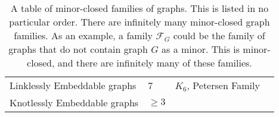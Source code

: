 \begin{table}[h!]
\begin{tabular}{@{}llll@{}}
    Linklessly Embeddable graphs & 7                                  & $K_6$, Petersen Family                           & \tablefootnote{\textcite{conwayKnotsLinksSpatial1983}} \\
    Knotlessly Embeddable graphs & $\geq 3$                           &                                                  & \tablefootnote{\textcite{conwayKnotsLinksSpatial1983,foisyIntrinsicallyKnottedGraphs2002,foisyIntrinsicallyKnottedGraphs2002}}          
    \end{tabular}
    \caption[Table of Minor-Closed Families of graphs]{A table of minor-closed families of graphs. This is listed in no particular order. There are infinitely many minor-closed graph families. As an example, a family $\mathcal{F}_G$ could be the family of graphs that do not contain graph $G$ as a minor. This is minor-closed, and there are infinitely many of these families.}
    \end{table}


